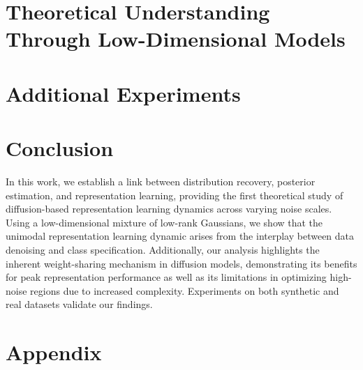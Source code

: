 \documentclass{article}
\begin{document}
\section{Theoretical Understanding Through Low-Dimensional Models}\label{sec:main}


\section{Additional Experiments}\label{sec:exp}


\section{Conclusion}
In this work, we establish a link between distribution recovery, posterior estimation, and representation learning, providing the first theoretical study of diffusion-based representation learning dynamics across varying noise scales. Using a low-dimensional mixture of low-rank Gaussians, we show that the unimodal representation learning dynamic arises from the interplay between data denoising and class specification. Additionally, our analysis highlights the inherent weight-sharing mechanism in diffusion models, demonstrating its benefits for peak representation performance as well as its limitations in optimizing high-noise regions due to increased complexity. Experiments on both synthetic and real datasets validate our findings.


% 

\newpage
\appendix
\section{Appendix}

\end{document}
